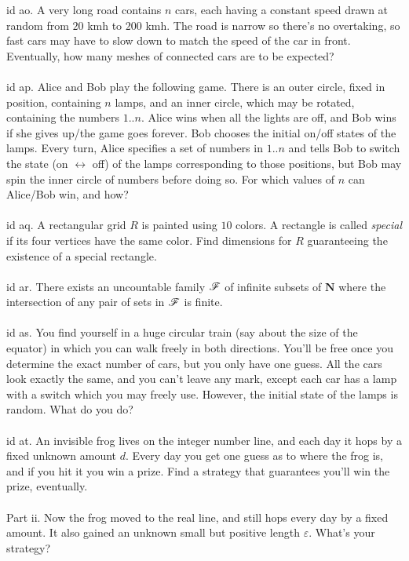 \documentclass[oneside]{book}
\newcommand{\eps}{\varepsilon}
\newcommand{\N}{\mathbf{N}}
\begin{document}
id ao. A very long road contains $n$ cars, each having a constant speed drawn at random from $20$ kmh to $200$ kmh. The road is narrow so there's no overtaking, so fast cars may have to slow down to match the speed of the car in front. Eventually, how many meshes of connected cars are to be expected?   \\\\


id ap. Alice and Bob play the following game. There is an outer circle, fixed in position, containing $n$ lamps, and an inner circle, which may be rotated, containing the numbers $1..n$. Alice wins when all the lights are off, and Bob wins if she gives up/the game goes forever. Bob chooses the initial on/off states of the lamps. Every turn, Alice specifies a set of numbers in $1..n$ and tells Bob to switch the state (on $\leftrightarrow$ off) of the lamps corresponding to those positions, but Bob may spin the inner circle of numbers before doing so. For which values of $n$ can Alice/Bob win, and how?     \\\\


id aq. A rectangular grid $R$ is painted using $10$ colors. A rectangle is called {\it special} if its four vertices have the same color. Find dimensions for $R$ guaranteeing the existence of a special rectangle.    \\\\


id ar. There exists an uncountable family $\mathscr{F}$ of infinite subsets of $\N$ where the intersection of any pair of sets in $\mathscr{F}$ is finite.  \\\\

id as. You find yourself in a huge circular train (say about the size of the equator) in which you can walk freely in both directions. You'll be free once you determine the exact number of cars, but you only have one guess. All the cars look exactly the same, and you can't leave any mark, except each car has a lamp with a switch which you may freely use. However, the initial state of the lamps is random. What do you do?   \\\\


id at. An invisible frog lives on the integer number line, and each day it hops by a fixed unknown amount $d$. Every day you get one guess as to where the frog is, and if you hit it you win a prize. Find a strategy that guarantees you'll win the prize, eventually.\\\\
Part ii. Now the frog moved to the real line, and still hops every day by a fixed amount. It also gained an unknown small but positive length $\eps$. What's your strategy? \\\\
\end{document}
